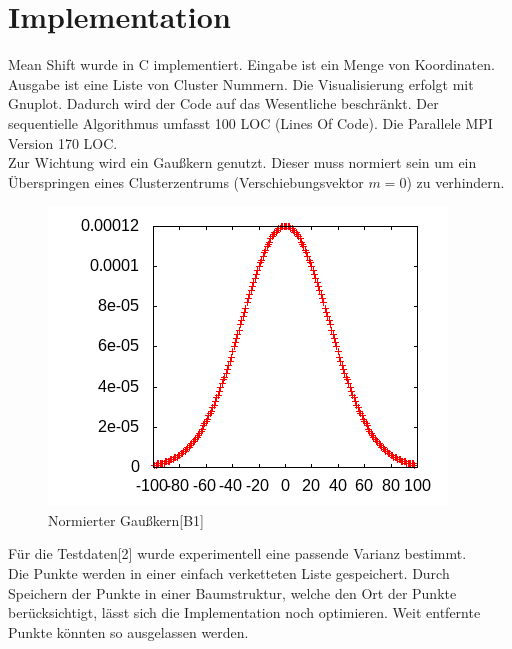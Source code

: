 \section{Implementation}
	Mean Shift wurde in C implementiert. 
	Eingabe ist ein Menge von Koordinaten. Ausgabe ist eine Liste von Cluster Nummern. Die Visualisierung erfolgt mit Gnuplot.
	Dadurch wird der Code auf das Wesentliche beschränkt.
	Der sequentielle Algorithmus umfasst 100 LOC (Lines Of Code). Die Parallele MPI Version 170 LOC.\\
	Zur Wichtung wird ein Gaußkern genutzt. Dieser muss normiert sein um ein Überspringen eines Clusterzentrums (Verschiebungsvektor $ m = 0 $) zu verhindern.\\
	\vspace{-10pt}
	\begin{figure}[H]
		\centering
		\includegraphics[scale=0.85]{../meanshift/output/pics/gauss.png} 
		\caption{Normierter Gaußkern[B1]}
	\end{figure}
	Für die Testdaten[2] wurde experimentell eine passende Varianz bestimmt.\\
	Die Punkte werden in einer einfach verketteten Liste gespeichert. Durch Speichern der Punkte in einer Baumstruktur, welche den Ort der
	Punkte berücksichtigt, lässt sich die Implementation noch optimieren. Weit entfernte Punkte könnten so ausgelassen werden.\\
